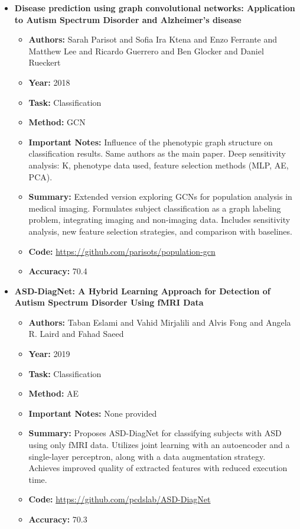 \documentclass{article}
\begin{document}
\begin{itemize}[left=0pt]
  \item \textbf{Disease prediction using graph convolutional networks: Application to Autism Spectrum Disorder and Alzheimer’s disease}
  \begin{itemize}
    \item \textbf{Authors:} Sarah Parisot and Sofia Ira Ktena and Enzo Ferrante and Matthew Lee and Ricardo Guerrero and Ben Glocker and Daniel Rueckert
    \item \textbf{Year:} 2018
    \item \textbf{Task:} Classification
    \item \textbf{Method:} GCN
    \item \textbf{Important Notes:} Influence of the phenotypic graph structure on classification results. Same authors as the main paper. Deep sensitivity analysis: K, phenotype data used, feature selection methods (MLP, AE, PCA).
    \item \textbf{Summary:} Extended version exploring GCNs for population analysis in medical imaging. Formulates subject classification as a graph labeling problem, integrating imaging and non-imaging data. Includes sensitivity analysis, new feature selection strategies, and comparison with baselines.
    \item \textbf{Code:} \url{https://github.com/parisots/population-gcn}
    \item \textbf{Accuracy:} 70.4
  \end{itemize}

  \item \textbf{ASD-DiagNet: A Hybrid Learning Approach for Detection of Autism Spectrum Disorder Using fMRI Data}
  \begin{itemize}
    \item \textbf{Authors:} Taban Eslami and Vahid Mirjalili and Alvis Fong and Angela R. Laird and Fahad Saeed
    \item \textbf{Year:} 2019
    \item \textbf{Task:} Classification
    \item \textbf{Method:} AE
    \item \textbf{Important Notes:} None provided
    \item \textbf{Summary:} Proposes ASD-DiagNet for classifying subjects with ASD using only fMRI data. Utilizes joint learning with an autoencoder and a single-layer perceptron, along with a data augmentation strategy. Achieves improved quality of extracted features with reduced execution time.
    \item \textbf{Code:} \url{https://github.com/pcdslab/ASD-DiagNet}
    \item \textbf{Accuracy:} 70.3
  \end{itemize}


\end{itemize}
\end{document}

